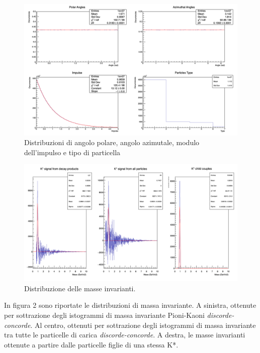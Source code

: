 \documentclass[12pt, a4paper]{article}
\begin{document}
\begin{figure}[H]
\centering
\includegraphics[scale=0.4]{images/DistributionsCanvas.png}

\label{fig:fig1}
\caption{Distribuzioni di angolo polare, angolo azimutale, modulo dell'impulso e tipo di particella}
\end{figure}

\begin{figure}[H]
\centering
\includegraphics[scale=0.4]{images/SignalCanvas.png}

\label{fig:fig2}
\caption{Distribuzione delle masse invarianti.}
\end{figure}

In figura 2 sono riportate le distribuzioni di massa invariante. A sinistra, ottenute per sottrazione degli istogrammi di massa invariante Pioni-Kaoni \textit{discorde-concorde}. Al centro, ottenuti per sottrazione degli istogrammi di massa invariante tra tutte le particelle di carica \textit{discorde-concorde}. A destra, le masse invarianti ottenute a partire dalle particelle figlie di una stessa K*.
\end{document}
